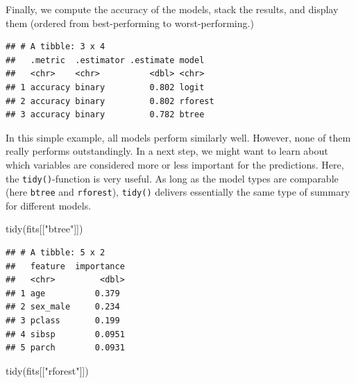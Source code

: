 \documentclass[
  12pt,
]{style/krantz}
\newenvironment{Shaded}{\begin{snugshade}}{\end{snugshade}}
\newcommand{\AttributeTok}[1]{\textcolor[rgb]{0.77,0.63,0.00}{#1}}
\newcommand{\ConstantTok}[1]{\textcolor[rgb]{0.00,0.00,0.00}{#1}}
\newcommand{\FunctionTok}[1]{\textcolor[rgb]{0.00,0.00,0.00}{#1}}
\newcommand{\NormalTok}[1]{#1}
\newcommand{\OtherTok}[1]{\textcolor[rgb]{0.56,0.35,0.01}{#1}}
\newcommand{\SpecialCharTok}[1]{\textcolor[rgb]{0.00,0.00,0.00}{#1}}
\newcommand{\StringTok}[1]{\textcolor[rgb]{0.31,0.60,0.02}{#1}}
\begin{document}
Finally, we compute the accuracy of the models, stack the results, and display them (ordered from best-performing to worst-performing.)

\begin{Shaded}
\end{Shaded}

\begin{verbatim}
## # A tibble: 3 x 4
##   .metric  .estimator .estimate model  
##   <chr>    <chr>          <dbl> <chr>  
## 1 accuracy binary         0.802 logit  
## 2 accuracy binary         0.802 rforest
## 3 accuracy binary         0.782 btree
\end{verbatim}

In this simple example, all models perform similarly well. However, none of them really performs outstandingly. In a next step, we might want to learn about which variables are considered more or less important for the predictions. Here, the \texttt{tidy()}-function is very useful. As long as the model types are comparable (here \texttt{btree} and \texttt{rforest}), \texttt{tidy()} delivers essentially the same type of summary for different models.

\begin{Shaded}
\begin{Highlighting}[]
\FunctionTok{tidy}\NormalTok{(fits[[}\StringTok{"btree"}\NormalTok{]])}
\end{Highlighting}
\end{Shaded}

\begin{verbatim}
## # A tibble: 5 x 2
##   feature  importance
##   <chr>         <dbl>
## 1 age          0.379 
## 2 sex_male     0.234 
## 3 pclass       0.199 
## 4 sibsp        0.0951
## 5 parch        0.0931
\end{verbatim}

\begin{Shaded}
\begin{Highlighting}[]
\FunctionTok{tidy}\NormalTok{(fits[[}\StringTok{"rforest"}\NormalTok{]])}
\end{Highlighting}
\end{Shaded}
\end{document}
